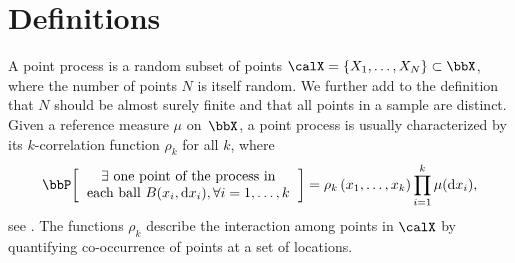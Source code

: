 \documentclass[twoside,11pt]{article}
\begin{document}



    \section{Definitions} %
    \label{sec:definitions}

        A point process is a random subset of points $\calX=\lrcb{X_1, \dots, X_N} \subset \bbX$, where the number of points $N$ is itself random.
        We further add to the definition that $N$ should be almost surely finite and that all points in a sample are distinct.
        Given a reference measure $\mu$ on~$\bbX$, a point process is usually characterized by its $k$-correlation function $\rho_k$ for all $k$, where
        \begin{equation*}
        \label{eq:correlation_function_intuition}
            \Proba{
                \begin{tabular}{c}
                    $\exists$ one point of the process in\\
                    each ball $B(x_i, \diff x_i), \forall i=1,\dots, k $
                \end{tabular}
            }
            = \rho_k\lrp{x_1,\dots,x_k}
                \prod_{i=1}^k \mu(\diff x_i),
        \end{equation*}
        see \citet[Section 4]{MoWa04}.
        The functions $\rho_k$ describe the interaction among points in $\calX$ by quantifying co-occurrence of points at a set of locations.
\end{document}
